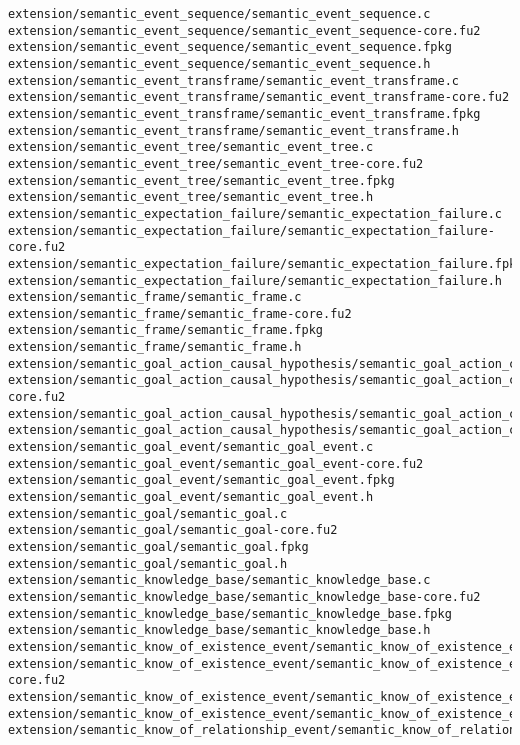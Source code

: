 \begin{lstlisting}
extension/semantic_event_sequence/semantic_event_sequence.c
extension/semantic_event_sequence/semantic_event_sequence-core.fu2
extension/semantic_event_sequence/semantic_event_sequence.fpkg
extension/semantic_event_sequence/semantic_event_sequence.h
extension/semantic_event_transframe/semantic_event_transframe.c
extension/semantic_event_transframe/semantic_event_transframe-core.fu2
extension/semantic_event_transframe/semantic_event_transframe.fpkg
extension/semantic_event_transframe/semantic_event_transframe.h
extension/semantic_event_tree/semantic_event_tree.c
extension/semantic_event_tree/semantic_event_tree-core.fu2
extension/semantic_event_tree/semantic_event_tree.fpkg
extension/semantic_event_tree/semantic_event_tree.h
extension/semantic_expectation_failure/semantic_expectation_failure.c
extension/semantic_expectation_failure/semantic_expectation_failure-core.fu2
extension/semantic_expectation_failure/semantic_expectation_failure.fpkg
extension/semantic_expectation_failure/semantic_expectation_failure.h
extension/semantic_frame/semantic_frame.c
extension/semantic_frame/semantic_frame-core.fu2
extension/semantic_frame/semantic_frame.fpkg
extension/semantic_frame/semantic_frame.h
extension/semantic_goal_action_causal_hypothesis/semantic_goal_action_causal_hypothesis.c
extension/semantic_goal_action_causal_hypothesis/semantic_goal_action_causal_hypothesis-core.fu2
extension/semantic_goal_action_causal_hypothesis/semantic_goal_action_causal_hypothesis.fpkg
extension/semantic_goal_action_causal_hypothesis/semantic_goal_action_causal_hypothesis.h
extension/semantic_goal_event/semantic_goal_event.c
extension/semantic_goal_event/semantic_goal_event-core.fu2
extension/semantic_goal_event/semantic_goal_event.fpkg
extension/semantic_goal_event/semantic_goal_event.h
extension/semantic_goal/semantic_goal.c
extension/semantic_goal/semantic_goal-core.fu2
extension/semantic_goal/semantic_goal.fpkg
extension/semantic_goal/semantic_goal.h
extension/semantic_knowledge_base/semantic_knowledge_base.c
extension/semantic_knowledge_base/semantic_knowledge_base-core.fu2
extension/semantic_knowledge_base/semantic_knowledge_base.fpkg
extension/semantic_knowledge_base/semantic_knowledge_base.h
extension/semantic_know_of_existence_event/semantic_know_of_existence_event.c
extension/semantic_know_of_existence_event/semantic_know_of_existence_event-core.fu2
extension/semantic_know_of_existence_event/semantic_know_of_existence_event.fpkg
extension/semantic_know_of_existence_event/semantic_know_of_existence_event.h
extension/semantic_know_of_relationship_event/semantic_know_of_relationship_event.c

\end{lstlisting}
